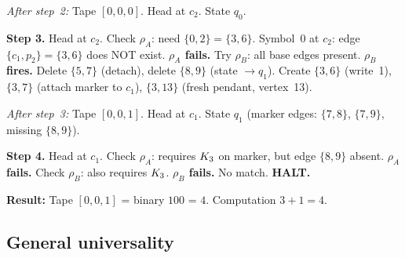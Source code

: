 \documentclass{../shared/primo}
\begin{document}
\emph{After step~2:} Tape $[0,0,0]$. Head at $c_2$. State $q_0$.

\textbf{Step 3.} Head at $c_2$. Check $\rho_A$: need $\{0,2\} = \{3, 6\}$. Symbol~0 at $c_2$: edge $\{c_1, p_2\} = \{3, 6\}$ does NOT exist. \textbf{$\rho_A$ fails.} Try $\rho_B$: all base edges present. \textbf{$\rho_B$ fires.} Delete $\{5,7\}$ (detach), delete $\{8,9\}$ (state $\to q_1$). Create $\{3,6\}$ (write~1), $\{3,7\}$ (attach marker to $c_1$), $\{3,13\}$ (fresh pendant, vertex~13).

\emph{After step~3:} Tape $[0,0,1]$. Head at $c_1$. State $q_1$ (marker edges: $\{7,8\}$, $\{7,9\}$, missing $\{8,9\}$).

\textbf{Step 4.} Head at $c_1$. Check $\rho_A$: requires $K_{3}$ on marker, but edge $\{8,9\}$ absent. \textbf{$\rho_A$ fails.} Check $\rho_B$: also requires $K_{3}$. \textbf{$\rho_B$ fails.} No match. \textbf{HALT.}

\textbf{Result:} Tape $[0,0,1]$ = binary $100$ = $4$. Computation $3 + 1 = 4$. \checkmark

\subsection{General universality}
\end{document}
